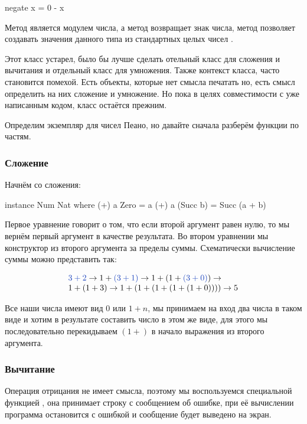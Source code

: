 \begin{code}
negate x = 0 - x
\end{code}

Метод  является модулем числа, а метод 
возвращает знак числа, метод  позволяет
создавать значения данного типа из стандартных целых чисел
.

Этот класс устарел, было бы лучше сделать 
отельный класс для сложения и вычитания и отдельный класс для 
умножения. Также контекст класса, часто становится помехой.
Есть объекты, которые нет смысла печатать но, есть смысл определить
на них сложение и умножение. Но пока в целях совместимости 
с уже написанным кодом, класс  остаётся прежним. 

Определим экземпляр для чисел Пеано, но давайте сначала
разберём функции по частям.


\subsubsection{Сложение}

Начнём со сложения:

\begin{code}
instance Num Nat where
    (+) a Zero     = a
    (+) a (Succ b) = Succ (a + b)
\end{code}

Первое уравнение говорит о том, что если второй аргумент
равен нулю, то мы вернём первый аргумент в качестве результата.
Во втором уравнении мы  конструктор
 из второго аргумента за пределы суммы. Схематически
вычисление суммы можно представить так:

\[
\begin{array}{l}
\Blue{3+2} \Ra 1+\Blue{(3+1)} \Ra 1+(1+\Blue{(3+0)}) \Ra \\
1+(1+3) \Ra 1+(1+(1+(1+(1+0)))) \Ra 5
\end{array}
\]  

Все наши числа имеют вид $0$ или $1+n$, мы принимаем на вход
два числа в таком виде и хотим в результате составить число
в этом же виде, для этого мы последовательно перекидываем
$(1+)$ в начало выражения из второго аргумента.

\subsubsection{Вычитание}

Операция отрицания не имеет смысла, поэтому мы воспользуемся 
специальной функцией , она
принимает строку с сообщением об ошибке, при её вычислении программа
остановится с ошибкой и сообщение будет выведено на экран.

